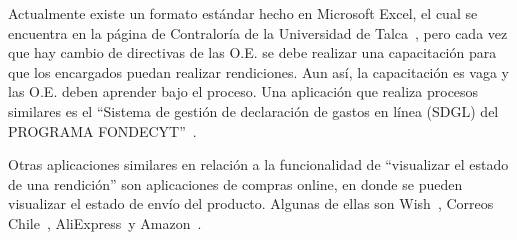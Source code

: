 
Actualmente existe un formato estándar hecho en Microsoft Excel, el cual se encuentra en la página de Contraloría de la Universidad de Talca~\cite{6}, pero cada vez que hay cambio de directivas de las O.E. se debe realizar una capacitación para que los encargados puedan realizar rendiciones. Aun así, la capacitación es vaga y las O.E. deben aprender bajo el proceso.
Una aplicación que realiza procesos similares es el ``Sistema de gestión de declaración de gastos en línea (SDGL) del PROGRAMA FONDECYT''~\cite{9}.

Otras aplicaciones similares en relación a la funcionalidad de ``visualizar el estado de una rendición'' son aplicaciones de compras online, en donde se pueden visualizar el estado de envío del producto. Algunas de ellas son Wish~\cite{10}, Correos Chile~\cite{11}, AliExpress~\cite{12 }y  Amazon~\cite{13}.